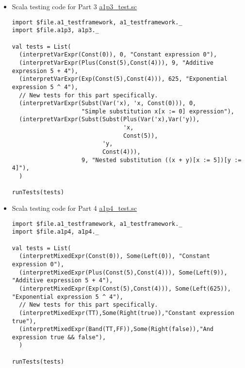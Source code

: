 \documentclass[11pt]{article}
\begin{document}
\begin{itemize}
\item Scala testing code for Part 3
\label{sec:org9f18db8}
\href{./testing/a1/a1p3\_test.sc}{a1p3\_test.sc}
\begin{verbatim}
import $file.a1_testframework, a1_testframework._
import $file.a1p3, a1p3._

val tests = List(
  (interpretVarExpr(Const(0)), 0, "Constant expression 0"),
  (interpretVarExpr(Plus(Const(5),Const(4))), 9, "Additive expression 5 + 4"),
  (interpretVarExpr(Exp(Const(5),Const(4))), 625, "Exponential expression 5 ^ 4"),
  // New tests for this part specifically.
  (interpretVarExpr(Subst(Var('x), 'x, Const(0))), 0,
                    "Simple substitution x[x := 0] expression"),
  (interpretVarExpr(Subst(Subst(Plus(Var('x),Var('y)),
                                'x,
                                Const(5)),
                          'y,
                          Const(4))),
                    9, "Nested substitution ((x + y)[x := 5])[y := 4]"),
  )

runTests(tests)
\end{verbatim}

\item Scala testing code for Part 4
\label{sec:orgf131a1f}
\href{./testing/a1/a1p4\_test.sc}{a1p4\_test.sc}
\begin{verbatim}
import $file.a1_testframework, a1_testframework._
import $file.a1p4, a1p4._

val tests = List(
  (interpretMixedExpr(Const(0)), Some(Left(0)), "Constant expression 0"),
  (interpretMixedExpr(Plus(Const(5),Const(4))), Some(Left(9)), "Additive expression 5 + 4"),
  (interpretMixedExpr(Exp(Const(5),Const(4))), Some(Left(625)), "Exponential expression 5 ^ 4"),
  // New tests for this part specifically.
  (interpretMixedExpr(TT),Some(Right(true)),"Constant expression true"),
  (interpretMixedExpr(Band(TT,FF)),Some(Right(false)),"And expression true && false"),
  )

runTests(tests)
\end{verbatim}
\end{itemize}
\end{document}
